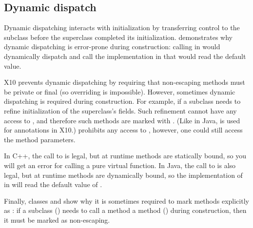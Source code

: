 \subsection{Dynamic dispatch}
Dynamic dispatching interacts with initialization by transferring control to the subclass
    before the superclass completed its initialization.
 demonstrates why dynamic dispatching is error-prone during construction:
    calling  in  would dynamically dispatch and
    call the implementation in 
    that would read the default value.

X10 prevents dynamic dispatching by requiring that non-escaping methods
    must be private or final
    (so overriding is impossible).
However, sometimes dynamic dispatching is required during construction.
For example, if a subclass needs to refine initialization
    of the superclass's fields.
Such refinement cannot have any access to \this, and therefore
    such methods are marked with .
(Like in Java,  is used for annotations in X10.)
 prohibits any access to \this,
    however, one could still access the method parameters.


In C++, the call to  is legal,
    but at runtime
    methods are statically bound,
    so you will get an error for calling a pure virtual function.
In Java, the call to  is also legal,
    but at runtime
    methods are dynamically bound,
    so the implementation of  in 
    will read the default value of .

Finally, classes  and  show why it is sometimes required to mark
    methods explicitly as :
    if a subclass () needs to call a method a method ()
    during construction, then it must be marked as non-escaping.


